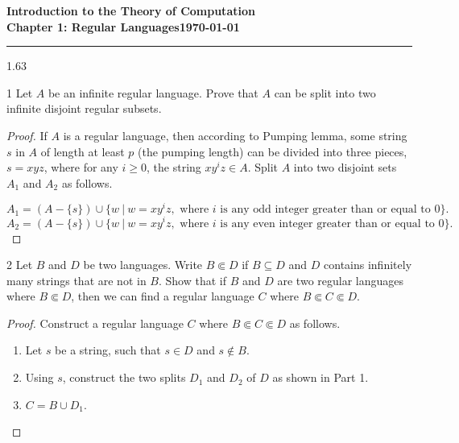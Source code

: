 \documentclass[11pt]{article}
\newcommand{\dated}{\today}
\begin{document}
\textbf{Introduction to the Theory of
Computation}\hfill\textbf{\myname}\\[0.01in]
\textbf{Chapter 1: Regular Languages}\hfill\textbf{\dated}\\
\smallskip\hrule\bigskip

\begin{problem}{1.63}
\end{problem}

\begin{problem}[Part]{1}
Let $A$ be an infinite regular language. Prove that $A$ can be split into two infinite disjoint regular subsets.
\end{problem}

\begin{proof}
If $A$ is a regular language, then according to Pumping lemma, some string $s$ in $A$ of length at least $p$ (the pumping length) can be divided into three pieces, $s = xyz$, where for any $i \geq 0$, the string $xy^iz \in A$. Split $A$ into two disjoint sets $A_1$ and $A_2$ as follows.

\[
A_1 = (A - \{s\}) \cup \{w \ | \ w = xy^iz, \text{ where } i \text{ is any odd integer greater than or equal to 0}\}. 
\]
\[
A_2 = (A - \{s\}) \cup \{w \ | \ w = xy^iz, \text{ where } i \text{ is any even integer greater than or equal to 0}\}. 
\]
\end{proof}

\begin{problem}[Part]{2}
Let $B$ and $D$ be two languages. Write $B \Subset D$ if $B \subseteq D$ and $D$ contains infinitely many strings that are not in $B$. Show that if $B$ and $D$ are two regular languages where $B \Subset D$, then we can find a regular language $C$ where $B \Subset C \Subset D$.
\end{problem}

\begin{proof}
Construct a regular language $C$ where $B \Subset C \Subset D$ as follows.
\begin{enumerate}
\item Let $s$ be a string, such that $s \in D$ and $s \notin B$.
\item Using $s$, construct the two splits $D_1$ and $D_2$ of $D$ as shown in Part 1.
\item $C = B \cup D_1$.
\end{enumerate}
\end{proof}
\end{document}
